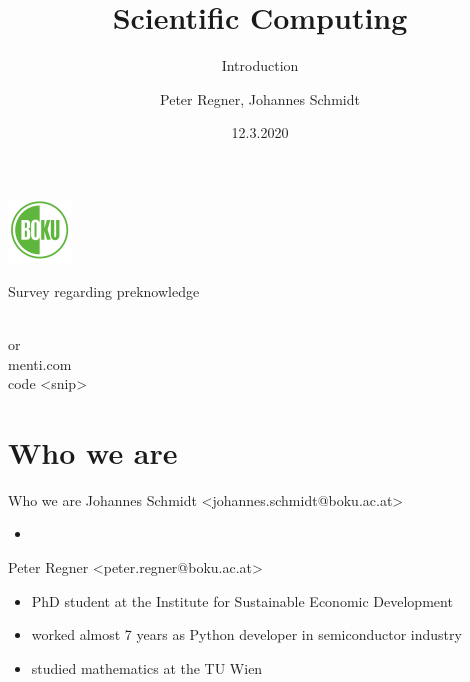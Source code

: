 \documentclass[10pt,color=usenames,dvipsnames]{beamer}
\title[Scientific Computing]{Scientific Computing}
\subtitle{Introduction}
\author{Peter Regner, Johannes Schmidt}
\institute{Institute for Sustainable Economic Development, BOKU, Wien}
\date{12.3.2020}
\begin{document}
\begin{frame}[plain]
    \maketitle
    \begin{center}
        \includegraphics[height=1.7cm]{boku-logo.pdf}\\
    \end{center}
\end{frame}

\begin{frame}{Survey regarding preknowledge}
    \begin{center}
        \textcolor{black}{
        }\\
        \vspace{0.5cm}
        \huge{
            or\\
            menti.com\\
            code <snip>
        }
    \end{center}
\end{frame}

\begin{frame}
	
	\tableofcontents
	
\end{frame}

\section{Who we are}

\begin{frame}{Who we are}
    Johannes Schmidt <johannes.schmidt@boku.ac.at>\\
    \begin{itemize}
        \item
    \end{itemize}

    \pause
    \bigskip

    Peter Regner <peter.regner@boku.ac.at>
    \begin{itemize}
        \item PhD student at the Institute for Sustainable Economic Development
        \item worked almost 7 years as Python developer in semiconductor industry
        \item studied mathematics at the TU Wien
    \end{itemize}
\end{frame}
\end{document}
